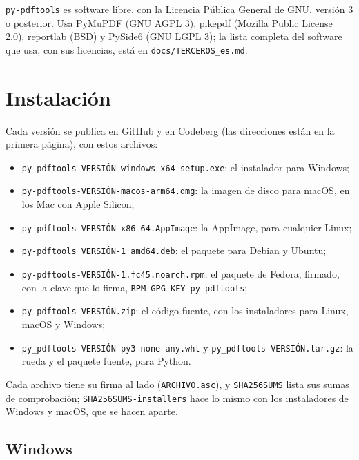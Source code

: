 \documentclass[12pt,
              article,
              oneside
              ]{memoir}
\begin{document}
%
\texttt{py-pdftools} es software libre, con la Licencia Pública General de
GNU, versión 3 o posterior. Usa PyMuPDF (GNU AGPL 3), pikepdf (Mozilla
Public License 2.0), reportlab (BSD) y PySide6 (GNU LGPL 3); la lista
completa del software que usa, con sus licencias, está en
\texttt{docs/TERCEROS\_es.md}.

\section{Instalación}
\label{sec:install}

Cada versión se publica en GitHub y en Codeberg (las direcciones están en
la primera página), con estos archivos:

%
\begin{itemize}
\item \texttt{py-pdftools-VERSIÓN-windows-x64-setup.exe}: el instalador
  para Windows;
\item \texttt{py-pdftools-VERSIÓN-macos-arm64.dmg}: la imagen de disco
  para macOS, en los Mac con Apple Silicon;
\item \texttt{py-pdftools-VERSIÓN-x86\_64.AppImage}: la AppImage, para
  cualquier Linux;
\item \texttt{py-pdftools\_VERSIÓN-1\_amd64.deb}: el paquete para Debian y
  Ubuntu;
\item \texttt{py-pdftools-VERSIÓN-1.fc45.noarch.rpm}: el paquete de
  Fedora, firmado, con la clave que lo firma,
  \texttt{RPM-GPG-KEY-py-pdftools};
\item \texttt{py-pdftools-VERSIÓN.zip}: el código fuente, con los
  instaladores para Linux, macOS y Windows;
\item \texttt{py\_pdftools-VERSIÓN-py3-none-any.whl} y
  \texttt{py\_pdftools-VERSIÓN.tar.gz}: la rueda y el paquete fuente, para
  Python.
\end{itemize}

\noindent Cada archivo tiene su firma al lado (\texttt{ARCHIVO.asc}), y
\texttt{SHA256SUMS} lista sus sumas de comprobación;
\texttt{SHA256SUMS-installers} hace lo mismo con los instaladores de
Windows y macOS, que se hacen aparte.

\subsection{Windows}
\end{document}
